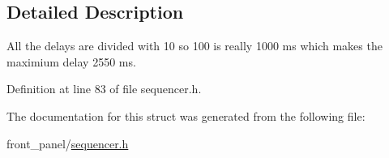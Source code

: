 \subsection{Detailed Description}
All the delays are divided with 10 so 100 is really 1000 ms which makes the maximium delay 2550 ms. 

Definition at line 83 of file sequencer.h.

The documentation for this struct was generated from the following file:\begin{CompactItemize}
\item 
front\_\-panel/\hyperlink{sequencer_8h}{sequencer.h}\end{CompactItemize}
